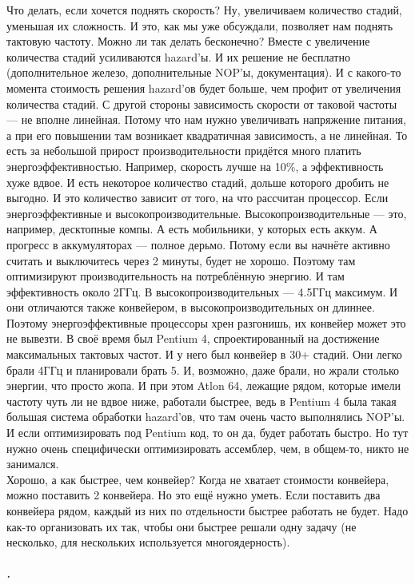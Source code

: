 \documentclass{article}
\begin{document}
    Что делать, если хочется поднять скорость? Ну, увеличиваем количество стадий, уменьшая их сложность. И это, как мы уже обсуждали, позволяет нам поднять тактовую частоту. Можно ли так делать бесконечно? Вместе с увеличение количества стадий усиливаются hazard'ы. И их решение не бесплатно (дополнительное железо, дополнительные NOP'ы, документация). И с какого-то момента стоимость решения hazard'ов будет больше, чем профит от увеличения количества стадий. С другой стороны зависимость скорости от таковой частоты --- не вполне линейная. Потому что нам нужно увеличивать напряжение питания, а при его повышении там возникает квадратичная зависимость, а не линейная. То есть за небольшой прирост производительности придётся много платить энергоэффективностью. Например, скорость лучше на 10\%, а эффективность хуже вдвое. И есть некоторое количество стадий, дольше которого дробить не выгодно. И это количество зависит от того, на что рассчитан процессор. Если энергоэффективные и высокопроизводительные. Высокопроизводительные --- это, например, десктопные компы. А есть мобильники, у которых есть аккум. А прогресс в аккумуляторах --- полное дерьмо. Потому если вы начнёте активно считать и выключитесь через 2 минуты, будет не хорошо. Поэтому там оптимизируют производительность на потреблённую энергию. И там эффективность около 2ГГц. В высокопроизводительных --- 4.5ГГц максимум. И они отличаются также конвейером, в высокопроизводительных он длиннее. Поэтому энергоэффективные процессоры хрен разгонишь, их конвейер может это не вывезти. В своё время был Pentium 4, спроектированный на достижение максимальных тактовых частот. И у него был конвейер в 30+ стадий. Они легко брали 4ГГц и планировали брать 5. И, возможно, даже брали, но жрали столько энергии, что просто жопа. И при этом Atlon 64, лежащие рядом, которые имели частоту чуть ли не вдвое ниже, работали быстрее, ведь в Pentium 4 была такая большая система обработки hazard'ов, что там очень часто выполнялись NOP'ы. И если оптимизировать под Pentium код, то он да, будет работать быстро. Но тут нужно очень специфически оптимизировать ассемблер, чем, в общем-то, никто не занимался.\\
    Хорошо, а как быстрее, чем конвейер? Когда не хватает стоимости конвейера, можно поставить 2 конвейера. Но это ещё нужно уметь. Если поставить два конвейера рядом, каждый из них по отдельности быстрее работать не будет. Надо как-то организовать их так, чтобы они быстрее решали одну задачу (не несколько, для нескольких используется многоядерность).
    \subparagraph{.}
\end{document}
